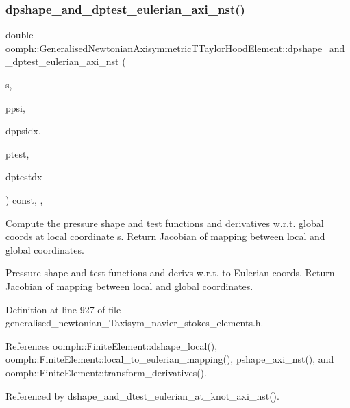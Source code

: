 \subsubsection{\texorpdfstring{dpshape\+\_\+and\+\_\+dptest\+\_\+eulerian\+\_\+axi\+\_\+nst()}{dpshape\_and\_dptest\_eulerian\_axi\_nst()}}
{\footnotesize\ttfamily double oomph\+::\+Generalised\+Newtonian\+Axisymmetric\+T\+Taylor\+Hood\+Element\+::dpshape\+\_\+and\+\_\+dptest\+\_\+eulerian\+\_\+axi\+\_\+nst (\begin{DoxyParamCaption}\item[{const \hyperlink{classoomph_1_1Vector}{Vector}$<$ double $>$ \&}]{s,  }\item[{\hyperlink{classoomph_1_1Shape}{Shape} \&}]{ppsi,  }\item[{\hyperlink{classoomph_1_1DShape}{D\+Shape} \&}]{dppsidx,  }\item[{\hyperlink{classoomph_1_1Shape}{Shape} \&}]{ptest,  }\item[{\hyperlink{classoomph_1_1DShape}{D\+Shape} \&}]{dptestdx }\end{DoxyParamCaption}) const\hspace{0.3cm}{\ttfamily [inline]}, {\ttfamily [protected]}, {\ttfamily [virtual]}}



Compute the pressure shape and test functions and derivatives w.\+r.\+t. global coords at local coordinate s. Return Jacobian of mapping between local and global coordinates. 

Pressure shape and test functions and derivs w.\+r.\+t. to Eulerian coords. Return Jacobian of mapping between local and global coordinates. 

Definition at line 927 of file generalised\+\_\+newtonian\+\_\+\+Taxisym\+\_\+navier\+\_\+stokes\+\_\+elements.\+h.



References oomph\+::\+Finite\+Element\+::dshape\+\_\+local(), oomph\+::\+Finite\+Element\+::local\+\_\+to\+\_\+eulerian\+\_\+mapping(), pshape\+\_\+axi\+\_\+nst(), and oomph\+::\+Finite\+Element\+::transform\+\_\+derivatives().



Referenced by dshape\+\_\+and\+\_\+dtest\+\_\+eulerian\+\_\+at\+\_\+knot\+\_\+axi\+\_\+nst().

\mbox{\label{classoomph_1_1GeneralisedNewtonianAxisymmetricTTaylorHoodElement_ab89dde891b3757c0e93551dca7e9d005}} 

